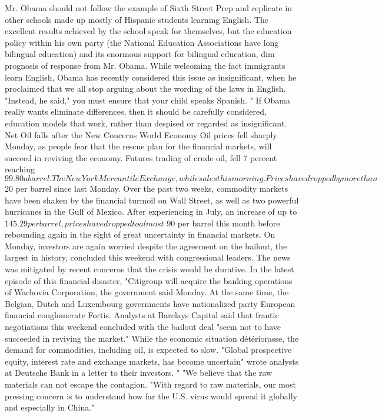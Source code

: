 Mr. Obama should not follow the example of Sixth Street Prep and replicate in other schools made up mostly of Hispanic students learning English.
The excellent results achieved by the school speak for themselves, but the education policy within his own party (the National Education Associations have long bilingual education) and its enormous support for bilingual education, dim prognosis of response from Mr. Obama.
While welcoming the fact immigrants learn English, Obama has recently considered this issue as insignificant, when he proclaimed that we all stop arguing about the wording of the laws in English.
"Instead, he said," you must ensure that your child speaks Spanish. "
If Obama really wants eliminate differences, then it should be carefully considered, education models that work, rather than despised or regarded as insignificant.
Net Oil falls after the New Concerns World Economy
Oil prices fell sharply Monday, as people fear that the rescue plan for the financial markets, will succeed in reviving the economy.
Futures trading of crude oil, fell 7 percent reaching $ 99.80 a barrel. The New York Mercantile Exchange, while sales this morning.
Prices have dropped by more than $ 20 per barrel since last Monday.
Over the past two weeks, commodity markets have been shaken by the financial turmoil on Wall Street, as well as two powerful hurricanes in the Gulf of Mexico.
After experiencing in July, an increase of up to $ 145.29 per barrel, prices have dropped to almost $ 90 per barrel this month before rebounding again in the sight of great uncertainty in financial markets.
On Monday, investors are again worried despite the agreement on the bailout, the largest in history, concluded this weekend with congressional leaders.
The news was mitigated by recent concerns that the crisis would be durative.
In the latest episode of this financial disaster, "Citigroup will acquire the banking operations of Wachovia Corporation, the government said Monday.
At the same time, the Belgian, Dutch and Luxembourg governments have nationalized party European financial conglomerate Fortis.
Analysts at Barclays Capital said that frantic negotiations this weekend concluded with the bailout deal "seem not to have succeeded in reviving the market."
While the economic situation détériorasse, the demand for commodities, including oil, is expected to slow.
"Global prospective equity, interest rate and exchange markets, has become uncertain" wrote analysts at Deutsche Bank in a letter to their investors. "
"We believe that the raw materials can not escape the contagion.
"With regard to raw materials, our most pressing concern is to understand how far the U.S. virus would spread it globally and especially in China."
